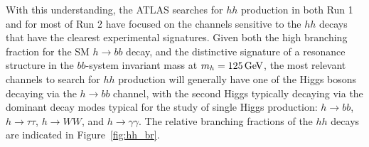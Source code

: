 
With this understanding, the ATLAS searches for $hh$ production in both Run 1 and for most of Run 2 have focused
on the channels sensitive to the $hh$ decays that have the clearest experimental signatures.
Given both the high branching fraction for the SM $h \rightarrow bb$ decay, and the distinctive signature
of a resonance structure in the $bb$-system invariant mass at $m_h = 125\,\text{Ge\kern -0.1em V}$, the most relevant channels to search for $hh$
production will generally have one of the Higgs bosons decaying via the $h \rightarrow bb$ channel, with the
second Higgs typically decaying via the dominant decay modes typical for the study of single Higgs production: $h \rightarrow bb$, $h \rightarrow \tau \tau$, 
$h \rightarrow WW$, and $h \rightarrow \gamma \gamma$.
The relative branching fractions of the $hh$ decays are indicated in Figure~\ref{fig:hh_br}.

